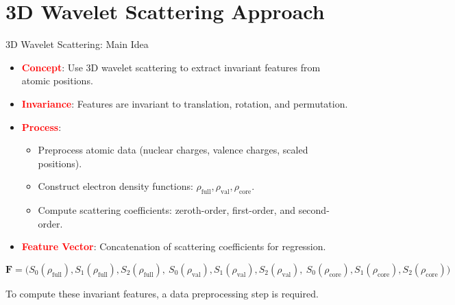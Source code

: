 \documentclass[10pt]{beamer}
\begin{document}
\section{3D Wavelet Scattering Approach}
\begin{frame}{3D Wavelet Scattering: Main Idea}
  \begin{itemize}
    \item \textcolor{red}{\textbf{Concept}}: Use 3D wavelet scattering to extract invariant features from atomic positions.
    \vspace{0.2cm}
    \item \textcolor{red}{\textbf{Invariance}}: Features are invariant to translation, rotation, and permutation.
    \vspace{0.2cm}
    \item \textcolor{red}{\textbf{Process}}:
      \begin{itemize}
        \item Preprocess atomic data (nuclear charges, valence charges, scaled positions).
        \vspace{0.1cm}
        \item Construct electron density functions: \( \rho_{\text{full}}, \rho_{\text{val}}, \rho_{\text{core}} \).
        \vspace{0.1cm}
        \item Compute scattering coefficients: zeroth-order, first-order, and second-order.
      \end{itemize}
    \vspace{0.2cm}
    \item \textcolor{red}{\textbf{Feature Vector}}: Concatenation of scattering coefficients for regression.
  \end{itemize}


{\small
\[
\mathbf{F} = \big(
S_0(\rho_{\text{full}}), S_1(\rho_{\text{full}}), S_2(\rho_{\text{full}}),\ 
S_0(\rho_{\text{val}}), S_1(\rho_{\text{val}}), S_2(\rho_{\text{val}}),\
S_0(\rho_{\text{core}}), S_1(\rho_{\text{core}}), S_2(\rho_{\text{core}})
\big)
\]
}


To compute these invariant features, a data preprocessing step is required.

\end{frame}
\end{document}
